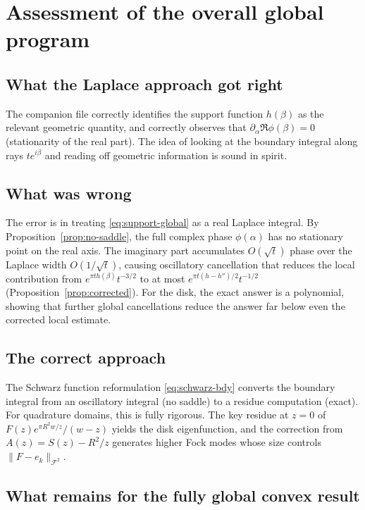 \documentclass[a4paper,11pt,reqno]{amsart}
\begin{document}
\section{Assessment of the overall global program}
\label{sec:assessment}

\subsection{What the Laplace approach got right}

The companion file correctly identifies the support function $h(\beta)$ as the
relevant geometric quantity, and correctly observes that $\partial_\alpha\Re\phi(\beta)=0$
(stationarity of the real part). The idea of looking at the boundary integral
along rays $te^{i\beta}$ and reading off geometric information is sound in
spirit.

\subsection{What was wrong}

The error is in treating \eqref{eq:support-global} as a real Laplace integral.
By Proposition~\ref{prop:no-saddle}, the full complex phase $\phi(\alpha)$
has no stationary point on the real axis. The imaginary part accumulates
$O(\sqrt{t})$ phase over the Laplace width $O(1/\sqrt{t})$, causing
oscillatory cancellation that reduces the local contribution from
$e^{\pi th(\beta)}t^{-3/2}$ to at most $e^{\pi t(h-h'')/2}t^{-1/2}$
(Proposition~\ref{prop:corrected}). For the disk, the exact answer is a
polynomial, showing that further global cancellations reduce the answer
far below even the corrected local estimate.

\subsection{The correct approach}

The Schwarz function reformulation \eqref{eq:schwarz-bdy} converts the
boundary integral from an oscillatory integral (no saddle) to a residue
computation (exact). For quadrature domains, this is fully rigorous.
The key residue at $z=0$ of $F(z)e^{\pi R^2 w/z}/(w-z)$ yields the disk
eigenfunction, and the correction from $A(z)=S(z)-R^2/z$ generates higher
Fock modes whose size controls $\|F-e_k\|_{\mathcal{F}^2}$.

\subsection{What remains for the fully global convex result}
\end{document}
